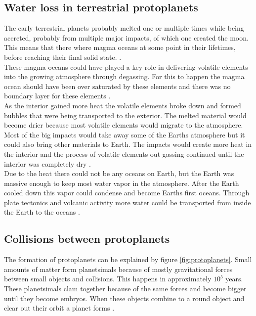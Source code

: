 \subsection{Water loss in terrestrial protoplanets}
The early terrestrial planets probably melted one or multiple times while being accreted, probably from multiple major impacts, of which one created the moon. This means that there where magma oceans at some point in their lifetimes, before reaching their final solid state.  \cite{TPformationPlanetesimals}. \\

These magma oceans could have played a key role in delivering volatile elements into the growing atmosphere through degassing. For this to happen the magma ocean should have been over saturated by these elements and there was no boundary layer for these elements \cite[p.~128-129]{TPmagma}. \\

As the interior gained more heat the volatile elements broke down and formed bubbles that were being transported to the exterior. The melted material would become drier because most volatile elements would migrate to the atmosphere. Most of the big impacts would take away some of the Earths atmosphere but it could also bring other materials to Earth. The impacts would create more heat in the interior and the process of volatile elements out gassing continued until the interior was completely dry \cite[p.~130-131]{TPmagma}.\\

Due to the heat there could not be any oceans on Earth, but the Earth was massive enough to keep most water vapor in the atmosphere. After the Earth cooled down this vapor could condense and become Earths first oceans. Through plate tectonics and volcanic activity more water could be transported from inside the Earth to the oceans \cite[p.~130-131]{TPmagma}.


\newpage
\subsection{Collisions between protoplanets}
The formation of protoplanets can be explained by figure \ref{fig:protoplanets}. Small amounts of matter form planetsimals because of mostly gravitational forces between small objects and collisions. This happens in approximately $10^5$ years. These planetsimals clam together because of the same forces and become bigger until they become embryos. When these objects combine to a round object and clear out their orbit a planet forms \cite[p.~118-120]{TPmagma} \cite{TPplanetesimals}.

